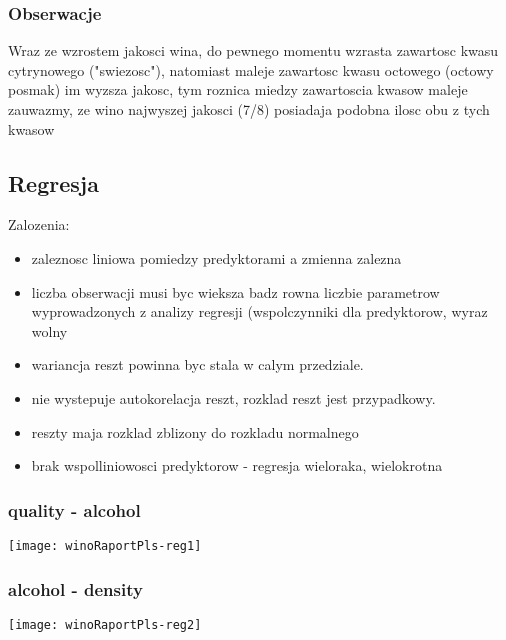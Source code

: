 \documentclass{article}
\begin{document}
\subsubsection{Obserwacje}
Wraz ze wzrostem jakosci wina, do pewnego momentu wzrasta zawartosc kwasu cytrynowego 
("swiezosc"), natomiast maleje zawartosc kwasu octowego (octowy posmak)
im wyzsza jakosc, tym roznica miedzy zawartoscia kwasow maleje
zauwazmy, ze wino najwyszej jakosci (7/8) posiadaja podobna ilosc obu z tych kwasow 




\subsection{Regresja}
Zalozenia:
\begin{itemize}
  \item zaleznosc liniowa pomiedzy predyktorami a zmienna zalezna 
  \item liczba obserwacji musi byc wieksza badz rowna liczbie parametrow wyprowadzonych z analizy regresji (wspolczynniki dla predyktorow, wyraz wolny
  \item wariancja reszt powinna byc stala w calym przedziale.
  \item nie wystepuje autokorelacja reszt, rozklad reszt jest przypadkowy.
  \item reszty maja rozklad zblizony do rozkladu normalnego
  \item brak wspolliniowosci predyktorow - regresja wieloraka, wielokrotna
\end{itemize}

\subsubsection{quality - alcohol}
\begin{Schunk}
\end{Schunk}
\texttt{[image: winoRaportPls-reg1]}


\subsubsection{alcohol - density}
\begin{Schunk}
\end{Schunk}
\texttt{[image: winoRaportPls-reg2]}
\end{document}
